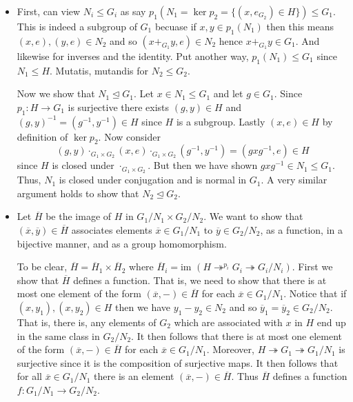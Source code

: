 \documentclass[12pt,letterpaper,boxed]{hmcpset}
\newcommand{\im}{\text{im }}
\newcommand{\inv}{^{-1}}
\newcommand{\normal}{\unlhd} %
\begin{document}
\begin{solution}
\begin{itemize}
\item First, can view $N_i \leq G_i$ as say $p_1(N_1 = \ker p_2 =
\{(x,e_{G_2}) \in H\}) \leq
G_1$. This is indeed a subgroup of $G_1$ becuase if $x, y \in
p_1(N_1)$ then this means $(x, e), (y, e) \in N_2$ and so $(x +_{G_1} y, e)
\in N_2$ hence $x +_{G_1} y \in G_1$. And likewise for inverses and
the identity. Put another way, $p_1(N_1) \leq G_1$ since $N_1 \leq H$. 
Mutatis, mutandis for $N_2 \leq G_2$. 

Now we show that $N_1 \unlhd G_1$.
Let $x \in N_1 \leq G_1$ and let $g \in G_1$. Since $p_1: H \to G_1$
is surjective there exists $(g, y) \in H$ and $(g, y)\inv = (g\inv, y\inv) \in H$
since $H$ is a subgroup. Lastly $(x,e) \in H$ by definition of $\ker
p_2$. 
Now consider \[
	(g, y) \cdot_{G_1 \times G_2} (x, e) \cdot_{G_1 \times G_2} (g\inv, y\inv) 
	= (g x g\inv, e) \in H
\]
since $H$ is closed under $\cdot_{G_1 \times G_2}$. But then we have
shown $g x g\inv \in N_1 \leq G_1$. Thus, $N_1$ is closed under
conjugation and is normal in $G_1$. A very similar argument holds to
show that $N_2 \normal G_2$. 

\item Let $\overline H$ be the image of $H$ in $G_1/N_1 \times
G_2/N_2$. We want to show that $(\overline x, \overline y) \in
\overline H$ associates elements $\overline x \in G_1/N_1$ to
$\overline y \in G_2 /N_2$, as a function, in a bijective manner, and
as a group homomorphism.

To be clear, $\overline H = \overline H_1 \times \overline H_2$ where
$\overline H_i = \im (H \twoheadrightarrow^{p_i} G_i
\twoheadrightarrow G_i / N_i)$. 
First we show that $\overline H$ defines a function. That is, we need
to show that there is at most one element of the form $(\overline x,
-) \in \overline H$ for each $\overline x \in G_1/N_1$. 
Notice that if $(x, y_1), (x, y_2) \in H$ then we have $y_1 - y_2 \in
N_2$ and so $\overline y_1 = \overline y_2 \in G_2 / N_2$. That is,
there is, any elements of $G_2$ which are associated with $x$ in $H$
end up in the same class in $G_2 / N_2$. It then follows that there is
at most one element of the form $(\overline x, -) \in \overline H$ for
each $\overline x \in G_1 / N_1$. Moreover, $H
\twoheadrightarrow G_1 \twoheadrightarrow G_1/N_1$ is surjective since
it is the composition of surjective maps. It then follows that for all
$\overline x \in G_1/N_1$ there is an element $(\overline x, -) \in
\overline H$. Thus $\overline H$ defines a function $f : G_1/N_1 \to
G_2/N_2$. 


\end{itemize}
\end{solution}
\end{document}
